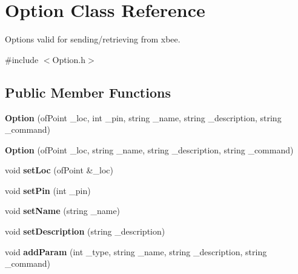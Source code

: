 \hypertarget{class_option}{
\section{Option Class Reference}
\label{class_option}
}


Options valid for sending/retrieving from xbee.  




{\ttfamily \#include $<$Option.h$>$}

\subsection*{Public Member Functions}
\begin{DoxyCompactItemize}
\item 
\hypertarget{class_option_aadd136054242c0d8e9b30d242f314de5}{
{\bfseries Option} (ofPoint \_\-loc, int \_\-pin, string \_\-name, string \_\-description, string \_\-command)}
\label{class_option_aadd136054242c0d8e9b30d242f314de5}

\item 
\hypertarget{class_option_aba3ebc23e5b578aaf4a1a33aafb62ba0}{
{\bfseries Option} (ofPoint \_\-loc, string \_\-name, string \_\-description, string \_\-command)}
\label{class_option_aba3ebc23e5b578aaf4a1a33aafb62ba0}

\item 
\hypertarget{class_option_abf07150989b73c874dbe1a27af76fcaa}{
void {\bfseries setLoc} (ofPoint \&\_\-loc)}
\label{class_option_abf07150989b73c874dbe1a27af76fcaa}

\item 
\hypertarget{class_option_abb82bb6cd8eab22050cbe0a3e0ff5c81}{
void {\bfseries setPin} (int \_\-pin)}
\label{class_option_abb82bb6cd8eab22050cbe0a3e0ff5c81}

\item 
\hypertarget{class_option_a9a20d624af04f15fe38c52e93d869d5c}{
void {\bfseries setName} (string \_\-name)}
\label{class_option_a9a20d624af04f15fe38c52e93d869d5c}

\item 
\hypertarget{class_option_a06c0e4cbc077ed7c2cb817d45ca1e390}{
void {\bfseries setDescription} (string \_\-description)}
\label{class_option_a06c0e4cbc077ed7c2cb817d45ca1e390}

\item 
\hypertarget{class_option_a2dc5822ffe4fb11daf1002debc0f06c7}{
void {\bfseries addParam} (int \_\-type, string \_\-name, string \_\-description, string \_\-command)}
\label{class_option_a2dc5822ffe4fb11daf1002debc0f06c7}


\end{DoxyCompactItemize}
